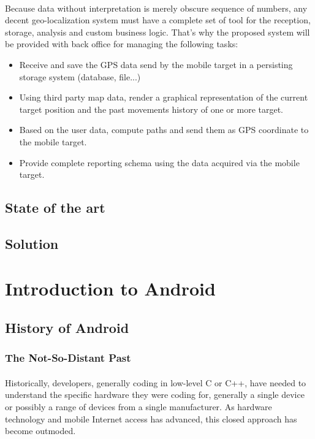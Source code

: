 \paragraph{}
Because data without interpretation is merely obscure sequence of numbers, any decent geo-localization system must have a complete set of tool for the reception, storage, analysis and custom business logic. That's why the proposed system will be provided with back office for managing the following tasks:
\begin{itemize}
\item Receive and save the GPS data send by the mobile target in a persisting storage system (database, file...)
\item Using third party map data, render a graphical representation of the current target position and the past movements history of one or more target.
\item Based on the user data, compute paths and send them as GPS coordinate to the mobile target.
\item Provide complete reporting schema using the data acquired via the mobile target.
\end{itemize}

\subsection{State of the art}
\subsection{Solution}
\paragraph{}

\section{Introduction to Android}
\subsection{History of Android}
\subsubsection{The Not-So-Distant Past}

\paragraph{}
Historically, developers, generally coding in low-level C or C++, have needed to understand the specific hardware they were coding for, generally a single device or possibly a range of devices from a single manufacturer. As hardware technology and mobile Internet access has advanced, this closed approach has become outmoded.

